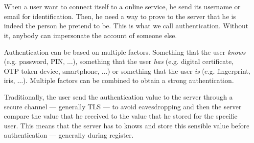 \documentclass[../report.tex]{subfiles}
\begin{document}


\chapter{}






\section{}
\subsection{}

\paragraph{}

When a user want to connect itself to a online service, he send its username or email for identification. Then, he need a way to prove to the server that he is indeed the person he pretend to be. This is what we call authentication. Without it, anybody can impersonate the account of someone else.

Authentication can be based on multiple factors. Something that the user \emph{knows} (e.g. password, PIN, ...), something that the user \emph{has} (e.g. digital certificate, OTP token device, smartphone, ...) or something that the user \emph{is} (e.g. fingerprint, iris, ...). Multiple factors can be combined to obtain a strong authentication.

Traditionally, the user send the authentication value to the server through a secure channel --- generally TLS --- to avoid eavesdropping and then the server compare the value that he received to the value that he stored for the specific user.
This means that the server has to knows and store this sensible value before authentication --- generally during register.
\end{document}
